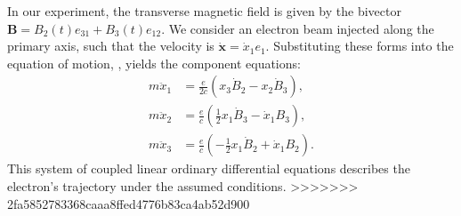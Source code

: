 In our experiment, the transverse magnetic field is given by the bivector
$\boldsymbol{B} = B_2(t) e_{31} + B_3(t) e_{12}$.
We consider an electron beam injected along the primary axis,
such that the velocity is $\dot{\boldsymbol{x}} = \dot{x}_1 e_1$.
Substituting these forms into the equation of motion, ,
yields the component equations:
\begin{align}
	m \ddot{x}_1 &= \frac{e}{2c} \left( x_3 \dot{B}_2 - x_2 \dot{B}_3 \right),
	\label{eq:eom-x1} \\
	m \ddot{x}_2 &= \frac{e}{c} \left( \frac{1}{2} x_1 \dot{B}_3 - \dot{x}_1 B_3
	\right),
	\label{eq:eom-x2} \\
		m \ddot{x}_3 &= \frac{e}{c} \left( -\frac{1}{2} x_1 \dot{B}_2 + \dot{x}_1 B_2
		\right).
	\label{eq:eom-x3}
\end{align}
This system of coupled linear ordinary differential equations describes the
electron's trajectory under the assumed conditions.
>>>>>>> 2fa5852783368caaa8ffed4776b83ca4ab52d900
